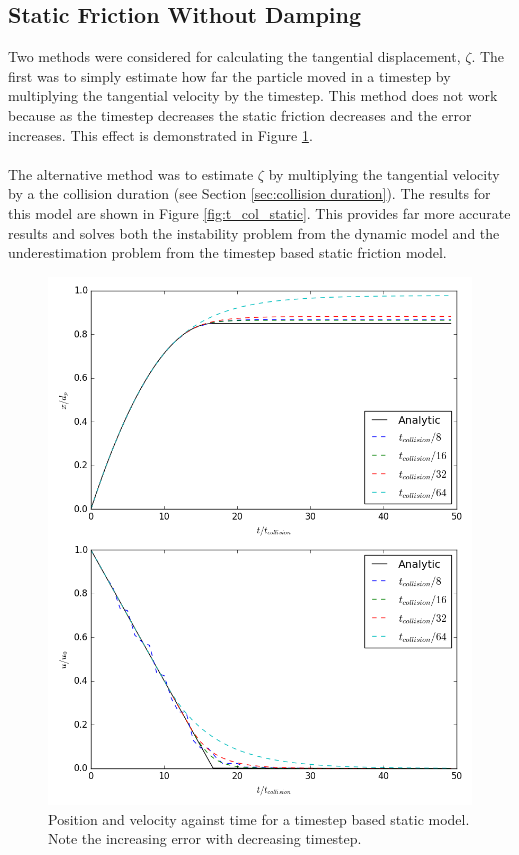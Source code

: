 \documentclass[10pt,a4paper,titlepage]{report}
\begin{document}
\subsection{Static Friction Without Damping}
Two methods were considered for calculating the tangential displacement, $\zeta$. The first was to simply estimate how far the particle moved in a timestep by multiplying the tangential velocity by the timestep. This method does not work because as the timestep decreases the static friction decreases and the error increases. This effect is demonstrated in Figure \ref{fig:delta_t_static}.
\\\\The alternative method was to estimate $\zeta$ by multiplying the tangential velocity by a the collision duration (see Section \ref{sec:collision duration}). The results for this model are shown in Figure \ref{fig:t_col_static}. This provides far more accurate results and solves both the instability problem from the dynamic model and the underestimation problem from the timestep based static friction model.
\begin{figure}[!ht]
\centering
\includegraphics[scale=0.5]{figures/friction_model/delta_t_static.png}
\caption{Position and velocity against time for a timestep based static model. Note the increasing error with decreasing timestep.}
\label{fig:delta_t_static}
\end{figure}
\end{document}
